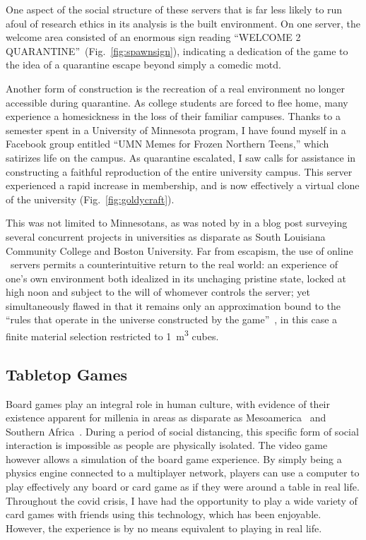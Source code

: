 \documentclass[2020/08/28 v2]{../../../coursework}
\newcommand{\mc}{\citetitle{Minecraft}}
\newcommand{\tbl}{\citetitle{Tabletop}}
\begin{document}
One aspect of the social structure of these servers that is far less likely to
run afoul of research ethics in its analysis is the built environment. On one server,
the welcome area consisted of an enormous sign reading
\enquote{WELCOME 2 QUARANTINE}~(Fig.~\ref{fig:spawnsign}), indicating a dedication of
the game to the idea of a quarantine escape beyond simply a comedic \ac{motd}.

Another form of construction is the recreation of a real environment no longer
accessible during quarantine.
As college students are forced to flee home, many experience a
homesickness in the loss of their familiar campuses. Thanks to a semester spent
in a University of Minnesota program, I have found myself in a Facebook group
entitled \enquote{UMN Memes for Frozen Northern Teens,} which satirizes life
on the campus. As quarantine escalated, I saw calls for assistance in constructing
a faithful reproduction of the entire university campus. This server experienced a rapid
increase in membership, and is now effectively a virtual clone of the university (Fig.~\ref{fig:goldycraft}).

This was not limited to Minnesotans, as was noted by \textcite{Anderson2020} in a
blog post surveying several concurrent projects in universities as disparate as South Louisiana
Community College and Boston University. Far from escapism, the use of online \mc\ servers
permits a counterintuitive return to the real world: an experience of one's own
environment both idealized in its unchaging pristine state, locked at high noon and 
subject to the will of whomever controls the server; yet simultaneously flawed
in that it remains only an approximation bound to the
\enquote{rules that operate in the universe constructed by the game}~\parencite[222]{Manovich2001},
in this case a finite material selection restricted to \SI{1}{\cubic\metre} cubes.

\subsection{Tabletop Games}

Board games play an integral role in human culture, with evidence of their
existence apparent for millenia in areas as disparate as Mesoamerica~\parencite{Voorhies2013}
and Southern Africa~\parencite{Townshend1979}. During a period of social distancing,
this specific form of social interaction is impossible as people are physically isolated.
The video game \tbl~\parencite{Tabletop} however allows a simulation of the board game
experience. By simply being a physics engine connected to a multiplayer network, players
can use a computer to play effectively any board or card game as if they were around
a table in real life. Throughout the \ac{covid} crisis, I have had the opportunity to
play a wide variety of card games with friends using this technology, which has been
enjoyable. However, the experience is by no means equivalent to playing in real life.
\end{document}
